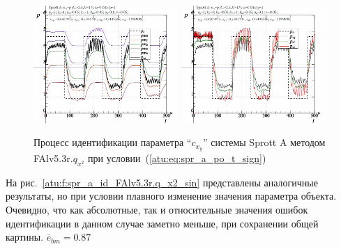 \begin{figure}[h!]
  \centerline{
    \includegraphics[width=0.49\textwidth]{p/cha/spr_a/FAlv5.3A/sprott_a_FAlv5x3r-pl_n_sign.png}
    \hfill
    \includegraphics[width=0.49\textwidth]{p/cha/spr_a/FAlv5.3A/sprott_a_FAlv5x3r-p_p_sign.png}
  }
  \caption{Процесс идентификации параметра ``$c_{x_y}$'' системы Sprott A методом FAlv5.3r.$q_{x^2}$ при условии~(\ref{atu:eq:spr_a_po_t_sign})}
  \label{atu:f:spr_a_id_FAlv5.3r.q_x2_sign}
\end{figure}

На рис.~\ref{atu:f:spr_a_id_FAlv5.3r.q_x2_sin} представлены аналогичные результаты,
но при условии плавного изменение значения параметра объекта. Очевидно, что
как абсолютные, так и относительные значения ошибок идентификации в данном случае заметно
меньше, при сохранении общей картины.
$\overline{e}_{bm}=0.87$

